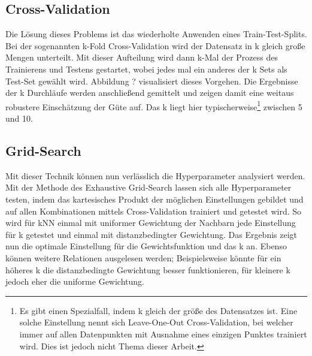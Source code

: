 \subsection*{Cross-Validation}

Die Lösung dieses Problems ist das wiederholte Anwenden eines Train-Test-Splits. Bei der sogenannten
 k-Fold Cross-Validation wird der Datensatz in k gleich große Mengen unterteilt. Mit dieser Aufteilung
 wird dann k-Mal der Prozess des Trainierens und Testens gestartet, wobei jedes mal ein anderes der k Sets als
 Test-Set gewählt wird. Abbildung ? visualisiert dieses Vorgehen. Die Ergebnisse der k Durchläufe werden
 anschließend gemittelt und zeigen damit eine weitaus robustere Einschätzung der Güte auf. Das k liegt hier
 typischerweise\footnote{Es gibt einen Spezialfall, indem k gleich der größe des Datensatzes ist. Eine solche
 Einstellung nennt sich Leave-One-Out Cross-Validation, bei welcher immer auf allen Datenpunkten mit Ausnahme
 eines einzigen Punktes trainiert wird. Dies ist jedoch nicht Thema dieser Arbeit.} zwischen 5 und 10.

\subsection*{Grid-Search}

Mit dieser Technik können nun verlässlich die Hyperparameter analysiert werden. Mit der Methode des Exhaustive
 Grid-Search lassen sich alle Hyperparameter testen, indem das kartesisches Produkt der möglichen Einstellungen
 gebildet und auf allen Kombinationen mittels Cross-Validation trainiert und getestet wird. So wird für kNN einmal
 mit uniformer Gewichtung der Nachbarn jede Einstellung für k getestet und einmal mit distanzbedingter Gewichtung.
 Das Ergebnis zeigt nun die optimale Einstellung für die Gewichtsfunktion und das k an. Ebenso können weitere
 Relationen ausgelesen werden; Beispielsweise könnte für ein höheres k die distanzbedingte Gewichtung besser
 funktionieren, für kleinere k jedoch eher die uniforme Gewichtung.
